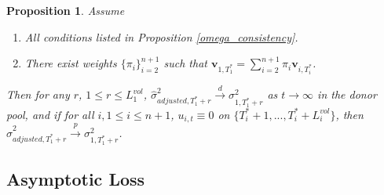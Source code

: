 \documentclass{uiucthesis2021}
\newcommand{\weight}{\pi}
\newtheorem{prop}{Proposition}
\theoremstyle{definition}
\begin{document}
  \begin{prop}\label{sigma_consistency}
    Assume
    \begin{enumerate}
      \item All conditions listed in Proposition \ref{omega_consistency}.
      \item There exist weights $\{\pi_{i}\}_{i=2}^{n+1}$ such that $\textbf{v}_{1,T_{1}^{*}} = \sum^{n+1}_{i=2}\weight_{i} \textbf{v}_{i,T_{i}^{*}}$.
     \end{enumerate}
  Then for any $r$, $1\leq r \leq L_{1}^{vol}$, $\hat\sigma^{2}_{adjusted,T_{1}^{*}+r}\overset{d}{\longrightarrow}\sigma^{2}_{1,T_{1}^{*}+r}$ as $t\rightarrow\infty$ in the donor pool, and if for all $i, 1 \leq i \leq n+ 1$, $u_{i,t} \equiv 0$ on $\{T^{*}_{i}+1,... ,T^{*}_{i}+L_{i}^{vol}\}$, then $\hat\sigma^{2}_{adjusted,T_{1}^{*}+r}\overset{p}{\longrightarrow}\sigma^{2}_{1,T_{1}^{*}+r}$.
  \end{prop}

\subsection{Asymptotic Loss}
\end{document}
